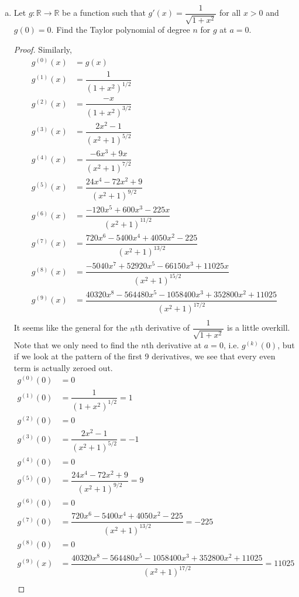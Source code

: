 \documentclass[10pt,letterpaper]{article}
\begin{document}
\begin{enumerate}[(a)]
\begin{proof}
	\end{proof}
	\item Let $g: \mathbb{R} \rightarrow \mathbb{R}$ be a function such that $g'(x) = \dfrac{1}{\sqrt{1 + x^2}}$
	for all $x > 0$ and $g(0) = 0$. Find the Taylor polynomial of degree $n$ for $g$ at $a = 0$.
	\begin{proof}
	Similarly, 
	\begin{align*}
		g^{(0)}(x) &= g(x) \\
		g^{(1)}(x) &= \dfrac{1}{(1 + x^2)^{1/2}} \\
		g^{(2)}(x) &= \dfrac{-x}{(1 + x^2)^{3/2}} \\
		g^{(3)}(x) &= \dfrac{2x^2 - 1}{(x^2 + 1)^{5/2}} \\
		g^{(4)}(x) &= \dfrac{-6x^3 + 9x}{(x^2 + 1)^{7/2}} \\
		g^{(5)}(x) &= \dfrac{24x^4 - 72x^2 + 9}{(x^2 + 1)^{9/2}} \\
		g^{(6)}(x) &= \dfrac{-120x^5 + 600x^3 - 225x}{(x^2 + 1)^{11/2}} \\
		g^{(7)}(x) &= \dfrac{720x^6 - 5400x^4 + 4050x^2 -225}{(x^2 + 1)^{13/2}} \\
		g^{(8)}(x) &= \dfrac{-5040x^7 + 52920x^5 - 66150x^3 + 11025x}{(x^2 + 1)^{15/2}} \\
		g^{(9)}(x) &= \dfrac{40320x^8 - 564480x^5 - 1058400x^3 + 352800x^2 + 11025}{(x^2 + 1)^{17/2}} \\
	\end{align*}	
	It seems like the general for the $n$th derivative of $\dfrac{1}{\sqrt{1 + x^2}}$ is a little
	overkill. Note that we only need to find the $n$th derivative at $a = 0$, i.e. $g^{(k)}(0)$, but if 
	we look at the pattern of the first 9 derivatives, we see that every even term is actually zeroed out.	
	\begin{align*}
		g^{(0)}(0) &= 0 \\
		g^{(1)}(0) &= \dfrac{1}{(1 + x^2)^{1/2}} = 1\\
		g^{(2)}(0) &= 0 \\
		g^{(3)}(0) &= \dfrac{2x^2 - 1}{(x^2 + 1)^{5/2}} = -1\\
		g^{(4)}(0) &= 0 \\
		g^{(5)}(0) &= \dfrac{24x^4 - 72x^2 + 9}{(x^2 + 1)^{9/2}} = 9 \\
		g^{(6)}(0) &= 0 \\
		g^{(7)}(0) &= \dfrac{720x^6 - 5400x^4 + 4050x^2 -225}{(x^2 + 1)^{13/2}} = -225\\
		g^{(8)}(0) &= 0 \\
		g^{(9)}(x) &= \dfrac{40320x^8 - 564480x^5 - 1058400x^3 + 352800x^2 + 11025}{(x^2 + 1)^{17/2}} = 11025 \\

\end{align*}
\end{proof}
\end{enumerate}
\end{document}
